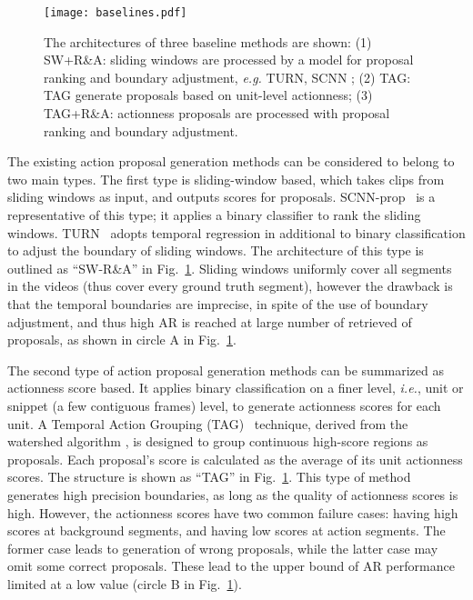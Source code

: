 \documentclass[runningheads]{llncs}
\begin{document}
\begin{figure}[t]
  \centering
    \texttt{[image: baselines.pdf]}
    \caption{The architectures of three baseline methods are shown: (1) SW+R\&A: sliding windows are processed by a model for proposal ranking and boundary adjustment, \emph{e.g.} TURN\cite{Gao_2017_ICCV}, SCNN \cite{Shou_2016_CVPR}; (2) TAG: TAG \cite{Zhao_2017_ICCV} generate proposals based on unit-level actionness; (3) TAG+R\&A: actionness proposals are processed with proposal ranking and boundary adjustment.}
      \label{fig: baselines}
\end{figure}

The existing action proposal generation methods can be considered to belong to two main types. The first type is sliding-window based, which takes clips from sliding windows as input, and outputs scores for proposals. SCNN-prop~\cite{Shou_2016_CVPR} is a representative of this type; it applies a binary classifier to rank 
the sliding windows. TURN~\cite{Gao_2017_ICCV} adopts temporal regression in additional to binary classification to adjust the boundary of sliding windows. The architecture of this type is outlined as ``SW-R\&A'' in Fig.~\ref{fig: baselines}. 
Sliding windows uniformly cover all segments in the videos (thus cover every ground truth segment), however the drawback is that the temporal boundaries are imprecise, in spite of the use of boundary adjustment, and thus high AR is reached at large number of retrieved of proposals, as shown in circle A in Fig.~\ref{fig: baselines}.

The second type of action proposal generation methods can be summarized as actionness score based. It applies binary classification on a finer level, \emph{i.e.}, unit or snippet (a few contiguous frames) level, to generate actionness scores for each unit. 
A Temporal Action Grouping (TAG)~\cite{Zhao_2017_ICCV} technique, derived from the watershed algorithm \cite{roerdink2000watershed}, is designed to group continuous high-score regions as proposals. 
Each proposal's score is calculated as the average of its unit actionness scores. 
The structure is shown as ``TAG'' in Fig.~\ref{fig: baselines}. 
This type of method generates high precision boundaries, as long as the quality of actionness scores is high. 
However, the actionness scores have two common failure cases: having high scores at background segments, and having low scores at action segments. 
The former case leads to generation of wrong proposals, while the latter case may omit some correct proposals. These lead to the upper bound of AR performance limited at a low value (circle B in Fig.~\ref{fig: baselines}).
\end{document}
